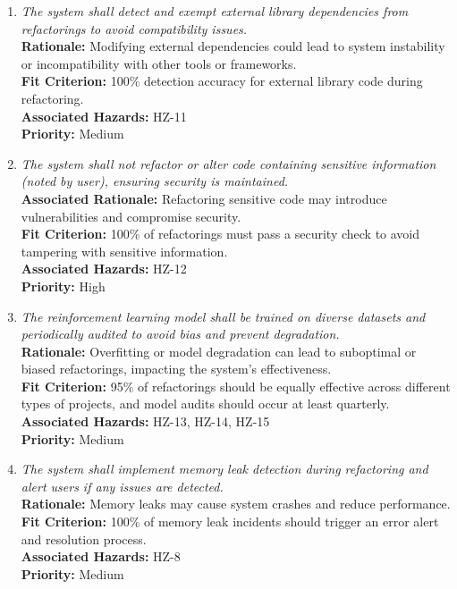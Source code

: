 \documentclass{article}
\begin{document}
\begin{enumerate}[label=SCR \arabic*., wide=0pt, leftmargin=*]
    \item \emph{The system shall detect and exempt external library dependencies from refactorings to avoid compatibility issues.}\\
    {\bf Rationale:} Modifying external dependencies could lead to system instability or incompatibility with other tools or frameworks.\\
    {\bf Fit Criterion:} 100\% detection accuracy for external library code during refactoring.\\
    {\bf Associated Hazards:} HZ-11\\
    {\bf Priority:} Medium

    \item \emph{The system shall not refactor or alter code containing sensitive information (noted by user), ensuring security is maintained.}\\
    {\bf Associated Rationale:} Refactoring sensitive code may introduce vulnerabilities and compromise security.\\
    {\bf Fit Criterion:} 100\% of refactorings must pass a security check to avoid tampering with sensitive information.\\
    {\bf Associated Hazards:} HZ-12\\
    {\bf Priority:} High

    \item \emph{The reinforcement learning model shall be trained on diverse datasets and periodically audited to avoid bias and prevent degradation.}\\
    {\bf Rationale:} Overfitting or model degradation can lead to suboptimal or biased refactorings, impacting the system's effectiveness.\\
    {\bf Fit Criterion:} 95\% of refactorings should be equally effective across different types of projects, and model audits should occur at least quarterly.\\
    {\bf Associated Hazards:} HZ-13, HZ-14, HZ-15\\
    {\bf Priority:} Medium

    \item \emph{The system shall implement memory leak detection during refactoring and alert users if any issues are detected.}\\
    {\bf Rationale:} Memory leaks may cause system crashes and reduce performance.\\
    {\bf Fit Criterion:} 100\% of memory leak incidents should trigger an error alert and resolution process.\\
    {\bf Associated Hazards:} HZ-8\\
    {\bf Priority:} Medium


\end{enumerate}
\end{document}
